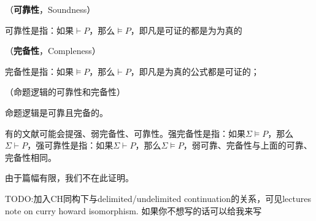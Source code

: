 \begin{defn}（\textbf{可靠性}，Soundness）

可靠性是指：如果$\vdash P$，那么$\models P$，即凡是可证的都是为为真的

\end{defn}



\begin{defn}（\textbf{完备性}，Compleness）

完备性是指：如果$\models P$，那么$\vdash P$，即凡是为真的公式都是可证的；

\end{defn}


\begin{thm}（命题逻辑的可靠性和完备性）

命题逻辑是可靠且完备的。
\end{thm}

\begin{rem}

有的文献可能会提强、弱完备性、可靠性。强完备性是指：如果$\Sigma \models P$，那么$\Sigma \vdash P$，强可靠性是指：如果$\Sigma \vdash P$，那么$\Sigma \models P$，弱可靠、完备性与上面的可靠、完备性相同。
\end{rem}


由于篇幅有限，我们不在此证明。


TODO:加入CH同构下与delimited/undelimited continuation的关系，可见lectures note on curry howard isomorphism. 如果你不想写的话可以给我来写
